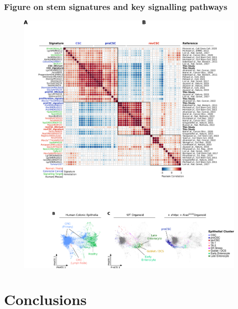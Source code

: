 \subsubsection{Figure on stem signatures and key signalling pathways}

\begin{figure}
    \centering
    \includegraphics{04seq/figs/4SEQ_StemSign.png}
    \caption{}
    \label{fig:}
\end{figure}

\section{Conclusions}





